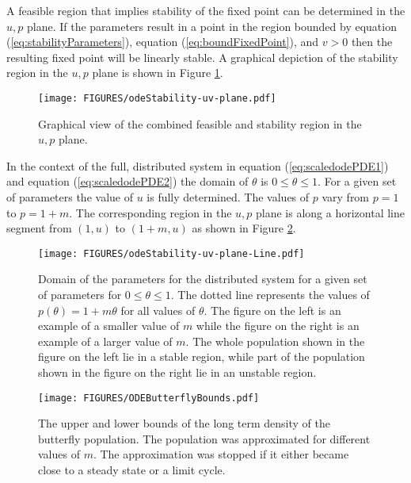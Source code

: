\documentclass[review]{elsarticle}
\begin{document}
A feasible region that implies stability of the fixed point can be
determined in the $u,p$ plane. If the parameters result in a point in
the region bounded by equation (\ref{eq:stabilityParameters}),
equation (\ref{eq:boundFixedPoint}), and $v>0$ then the resulting
fixed point will be linearly stable. A graphical depiction of the
stability region in the $u,p$ plane is shown in Figure
\ref{fig:uvStabilityRegion}.

\begin{figure}[htb]
  \centering
  \texttt{[image: FIGURES/odeStability-uv-plane.pdf]}
  \caption[Stability region in the $u,p$ plane.]{Graphical view of the
    combined feasible and stability region in the $u,p$ plane.}
  \label{fig:uvStabilityRegion}
\end{figure}

In the context of the full, distributed system in equation
(\ref{eq:scaledodePDE1}) and equation (\ref{eq:scaledodePDE2}) the
domain of $\theta$ is $0\leq\theta\leq 1$. For a given set of
parameters the value of $u$ is fully determined. The values of $p$
vary from $p=1$ to $p=1+m$.  The corresponding region in the $u,p$
plane is along a horizontal line segment from $(1,u)$ to
$(1+m,u)$ as shown in Figure \ref{fig:distributedLineSegment}.

\begin{figure}[htb]
  \centering
  \texttt{[image: FIGURES/odeStability-uv-plane-Line.pdf]}
  \caption[Domain of the distributed system in the $u,p$
  plane.]{Domain of the parameters for the distributed system for a
    given set of parameters for $0\leq\theta\leq 1$. The dotted line
    represents the values of $p(\theta)=1+m\theta$ for all
    values of $\theta$. The figure on the left is an example of a
    smaller value of $m$ while the figure on the right is an example
    of a larger value of $m$. The whole population shown in the figure
    on the left lie in a stable region, while part of the population
    shown in the figure on the right lie in an unstable region.}
  \label{fig:distributedLineSegment}
\end{figure}

\begin{figure}[htb]
  \centering
  \texttt{[image: FIGURES/ODEButterflyBounds.pdf]}
  \caption[Upper and lower bounds of the butterfly density.]{The upper
    and lower bounds of the long term density of the butterfly
    population. The population was approximated for different values
    of $m$. The approximation was stopped if it either became close to
    a steady state or a limit cycle.}
  \label{fig:odeButterflyBifurcation}
\end{figure}
\end{document}
